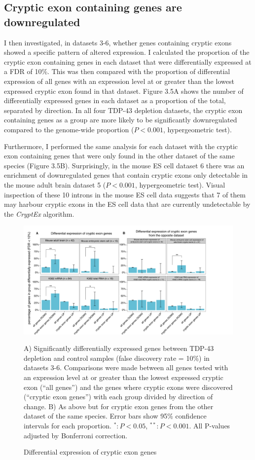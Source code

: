 \subsection{Cryptic exon containing genes are downregulated}
I then investigated, in datasets 3-6, whether genes containing cryptic exons showed a specific pattern of altered expression. I calculated the proportion of the cryptic exon containing genes in each dataset that were differentially expressed at a FDR of 10\%. This was then compared with the proportion of differential expression of all genes with an expression level at or greater than the lowest expressed cryptic exon found in that dataset. Figure 3.5A shows the number of differentially expressed genes in each dataset as a proportion of the total, separated by direction. In all four TDP-43 depletion datasets, the cryptic exon containing genes as a group are more likely to be significantly downregulated compared to the genome-wide proportion ($P < 0.001$, hypergeometric test).

Furthermore, I performed the same analysis for each dataset with the cryptic exon containing genes that were only found in the other dataset of the same species (Figure 3.5B). Surprisingly, in the mouse ES cell dataset 6 there was an enrichment of downregulated genes that contain cryptic exons only detectable in the mouse adult brain dataset 5 ($P < 0.001$, hypergeometric test). Visual inspection of these 10 introns in the mouse ES cell data suggests that 7 of them may harbour cryptic exons in the ES cell data that are currently undetectable by the \emph{CryptEx} algorithm.

\begin{figure}[h!]
	\begin{center}
		\includegraphics[width=16cm]{Figures/03_cryptic_exons/Figure_5_Gene_Expression.png}
	\end{center}
	\caption{Differential expression of cryptic exon genes}
		A) Significantly differentially expressed genes between TDP-43 depletion and control samples (false discovery rate = 10\%) in datasets 3-6. Comparisons were made between all genes tested with an expression level at or greater than the lowest expressed cryptic exon (``all genes'') and the genes where cryptic exons were discovered (``cryptic exon genes'') with each group divided by direction of change. B) As above but for cryptic exon genes from the other dataset of the same species. Error bars show 95\% confidence intervals for each proportion. $^* : P < 0.05$, $^{**} : P < 0.001$. All P-values adjusted by Bonferroni correction.
\end{figure}

